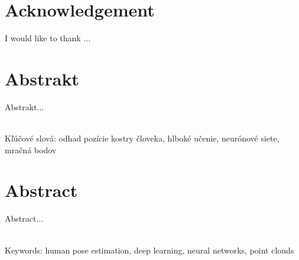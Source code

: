 \documentclass[12pt, a4paper, oneside]{book}
\begin{document}
\chapter*{Acknowledgement}\label{chap:thank_you}
I would like to thank ...

\chapter*{Abstrakt}\label{chap:abstract_sk}
Abstrakt...

~\\
Kľúčové slová: odhad pozície kostry človeka, hlboké učenie, neurónové siete, mračná bodov
\vfill\eject 

\chapter*{Abstract}\label{chap:abstract_en}
Abstract...

~\\
Keywords: human pose estimation, deep learning, neural networks, point clouds
\vfill\eject 


\tableofcontents

\listoftables
\listoffigures

\mainmatter










\backmatter

\nocite{*}


\end{document}
